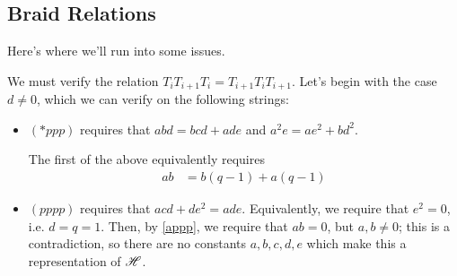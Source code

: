 \documentclass{amsart}
\begin{document}
\subsection*{Braid Relations}
Here's where we'll run into some issues.

We must verify the relation $T_iT_{i+1}T_i = T_{i+1}T_iT_{i+1}$.
Let's begin with the case $d \neq 0$, which we can verify on the following strings:
\begin{itemize}
  \item $(*ppp)$ requires that $abd = bcd + ade$ and $a^2e = ae^2 + bd^2$.

    The first of the above equivalently requires
    \begin{align}
      ab &= b(q-1) + a(q-1)
    \label{appp}
    \end{align}
  
    \item $(pppp)$ requires that $acd + de^2 = ade$.
     Equivalently, we require that $e^2 = 0$, i.e. $d = q = 1$.
     Then, by \eqref{appp}, we require that $ab = 0$, but $a,b \neq 0$;
     this is a contradiction, so there are no constants $a,b,c,d,e$ which make this a representation of $\mathscr{H}$.

     \iffalse
    These together imply that $a = b$, and that $a = 2(q-1)$;
     when $q \neq \frac{1}{2}, 2$ this contradicts \eqref{ab}.
  \item $(*p*p)$ requires that $b^2c = bc^2 + ad^2$ and $abd = bcd + ade$.
    Equivalently, we require that
    \begin{align}
      b^2(d^2-1) &= b(d^2-1)^2 + ad^2 \label{bq}\\
      ab &= b(q-1) + a(q - 1).\nonumber
    \end{align}
    In particular, we have that
    \[
      bd^4 + (a - 2b - b^2)d^2 + b - b^2 = 0 = ad^4 + (b - 2a)d^2 - a^2d + a. 
    \]
    Equivalently, $d$ is a root of the polynomial $(a-b)d^4 + (3b - 3a + b^2)d^2 - a^2d + (2b + b^2)$.
    \fi

\end{itemize}
\end{document}
